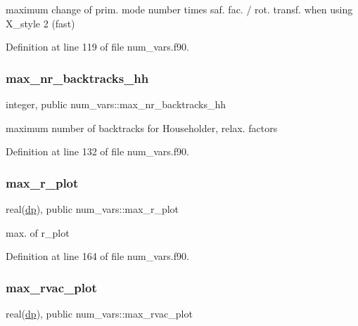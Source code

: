 maximum change of prim. mode number times saf. fac. / rot. transf. when using X\+\_\+style 2 (fast) 



Definition at line 119 of file num\+\_\+vars.\+f90.

\mbox{\label{namespacenum__vars_aa77741498300b095e49a5d8344480b68}} 
\subsubsection{\texorpdfstring{max\+\_\+nr\+\_\+backtracks\+\_\+hh}{max\_nr\_backtracks\_hh}}
{\footnotesize\ttfamily integer, public num\+\_\+vars\+::max\+\_\+nr\+\_\+backtracks\+\_\+hh}



maximum number of backtracks for Householder, relax. factors 



Definition at line 132 of file num\+\_\+vars.\+f90.

\mbox{\label{namespacenum__vars_a1f9d7347043448d30c6612558ae569e5}} 
\subsubsection{\texorpdfstring{max\+\_\+r\+\_\+plot}{max\_r\_plot}}
{\footnotesize\ttfamily real(\hyperlink{namespacenum__vars_a03802aa2bd86439d7a9370836fabf3f2}{dp}), public num\+\_\+vars\+::max\+\_\+r\+\_\+plot}



max. of {\ttfamily r\+\_\+plot} 



Definition at line 164 of file num\+\_\+vars.\+f90.

\mbox{\label{namespacenum__vars_a6b703d539ded323851dce024a4b33df7}} 
\subsubsection{\texorpdfstring{max\+\_\+rvac\+\_\+plot}{max\_rvac\_plot}}
{\footnotesize\ttfamily real(\hyperlink{namespacenum__vars_a03802aa2bd86439d7a9370836fabf3f2}{dp}), public num\+\_\+vars\+::max\+\_\+rvac\+\_\+plot}



